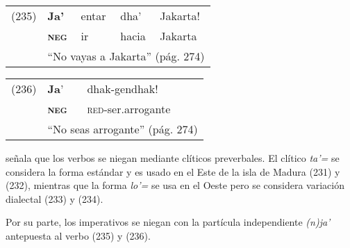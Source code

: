 {%
\begin{tabular}{lllll}
(235) & \textbf{Ja'} & entar & dha’ & Jakarta! \\
& \textsc{\textbf{neg}} & ir & hacia & Jakarta \\
& \multicolumn{4}{l}{``No vayas a Jakarta'' (pág. 274)}
\end{tabular} \vspace{0.5cm}

\begin{tabular}{lll}
(236) & \textbf{Ja}' & dhak-gendhak! \\
& \textsc{\textbf{neg}} & \textsc{red}-ser.arrogante \\
& \multicolumn{2}{l}{``No seas arrogante'' (pág. 274)}
\end{tabular} \vspace{0.5cm}

}

\textcolor{MidnightBlue}{\citet{madu}} señala que los verbos se niegan mediante clíticos preverbales. El clítico {\setmainfont{Charis SIL} \textit{ta'=}} se considera la forma estándar y es usado en el Este de la isla de Madura (231) y (232), mientras que la forma {\setmainfont{Charis SIL} \textit{lo'=}} se usa en el Oeste pero se considera variación dialectal (233) y (234).

Por su parte, los imperativos se niegan con la partícula independiente {\setmainfont{Charis SIL} \textit{(n)ja'}} antepuesta al verbo (235) y (236).